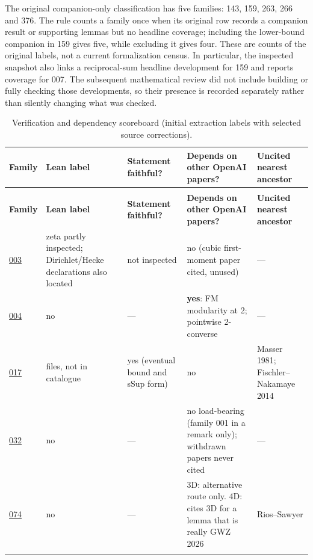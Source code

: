 \documentclass[11pt]{article}
\begin{document}
The original companion-only classification has five families: 143, 159, 263, 266 and 376. The rule counts a family once when its original row records a companion result or supporting lemmas but no headline coverage; including the lower-bound companion in 159 gives five, while excluding it gives four. These are counts of the original labels, not a current formalization census. In particular, the inspected snapshot also links a reciprocal-sum headline development for 159 and reports coverage for 007. The subsequent mathematical review did not include building or fully checking those developments, so their presence is recorded separately rather than silently changing what was checked.
{\footnotesize\setlength{\tabcolsep}{3pt}
\begin{longtable}{@{}>{\raggedright\arraybackslash}p{}>{\raggedright\arraybackslash}p{}>{\raggedright\arraybackslash}p{}>{\raggedright\arraybackslash}p{}>{\raggedright\arraybackslash}p{}@{}}
\caption{Verification and dependency scoreboard (initial extraction labels with selected source corrections).}\label{tab:scoreboard}\\
\toprule
\textbf{Family} & \textbf{Lean label} & \textbf{Statement faithful?} & \textbf{Depends on other OpenAI papers?} & \textbf{Uncited nearest ancestor} \\
\midrule
\endfirsthead
\multicolumn{5}{@{}l}{\emph{(continued)}}\\
\toprule
\textbf{Family} & \textbf{Lean label} & \textbf{Statement faithful?} & \textbf{Depends on other OpenAI papers?} & \textbf{Uncited nearest ancestor} \\
\midrule
\endhead
\bottomrule
\endfoot
\hyperref[fam:003]{003} & zeta partly inspected; Dirichlet/Hecke declarations also located & not inspected & no (cubic first-moment paper cited, unused) & --- \\ \addlinespace
\hyperref[fam:004]{004} & no & --- & \textbf{yes}: FM modularity at 2; pointwise 2-converse & --- \\ \addlinespace
\hyperref[fam:017]{017} & 867 files, not in catalogue & yes (eventual bound and sSup form) & no & Masser 1981; Fischler--Nakamaye 2014 \\ \addlinespace
\hyperref[fam:032]{032} & no & --- & no load-bearing (family 001 in a remark only); withdrawn papers never cited & --- \\ \addlinespace
\hyperref[fam:074]{074} & no & --- & 3D: alternative route only. 4D: cites 3D for a lemma that is really GWZ 2026 & Rios--Sawyer \\ \addlinespace

\end{longtable}}
\end{document}
